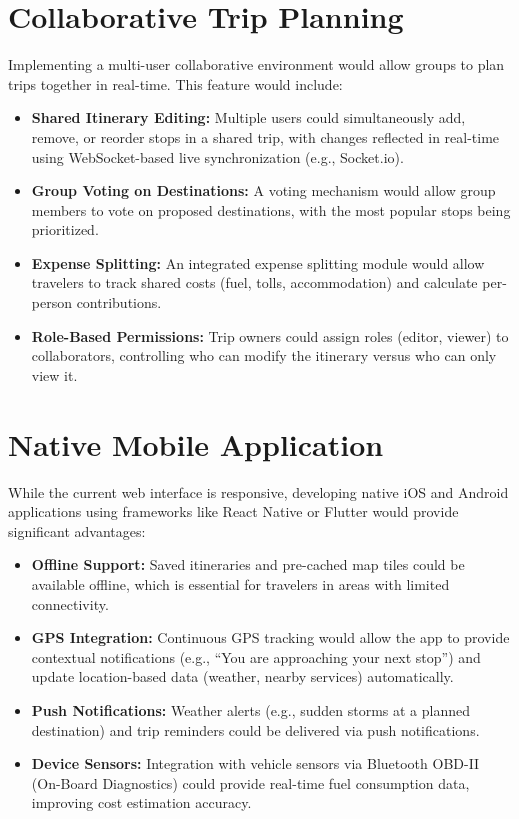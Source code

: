 \section{Collaborative Trip Planning}
Implementing a multi-user collaborative environment would allow groups to plan trips together in real-time. This feature would include:
\begin{itemize}
    \item \textbf{Shared Itinerary Editing:} Multiple users could simultaneously add, remove, or reorder stops in a shared trip, with changes reflected in real-time using WebSocket-based live synchronization (e.g., Socket.io).
    \item \textbf{Group Voting on Destinations:} A voting mechanism would allow group members to vote on proposed destinations, with the most popular stops being prioritized.
    \item \textbf{Expense Splitting:} An integrated expense splitting module would allow travelers to track shared costs (fuel, tolls, accommodation) and calculate per-person contributions.
    \item \textbf{Role-Based Permissions:} Trip owners could assign roles (editor, viewer) to collaborators, controlling who can modify the itinerary versus who can only view it.
\end{itemize}

\section{Native Mobile Application}
While the current web interface is responsive, developing native iOS and Android applications using frameworks like React Native or Flutter would provide significant advantages:
\begin{itemize}
    \item \textbf{Offline Support:} Saved itineraries and pre-cached map tiles could be available offline, which is essential for travelers in areas with limited connectivity.
    \item \textbf{GPS Integration:} Continuous GPS tracking would allow the app to provide contextual notifications (e.g., ``You are approaching your next stop'') and update location-based data (weather, nearby services) automatically.
    \item \textbf{Push Notifications:} Weather alerts (e.g., sudden storms at a planned destination) and trip reminders could be delivered via push notifications.
    \item \textbf{Device Sensors:} Integration with vehicle sensors via Bluetooth OBD-II (On-Board Diagnostics) could provide real-time fuel consumption data, improving cost estimation accuracy.
\end{itemize}

